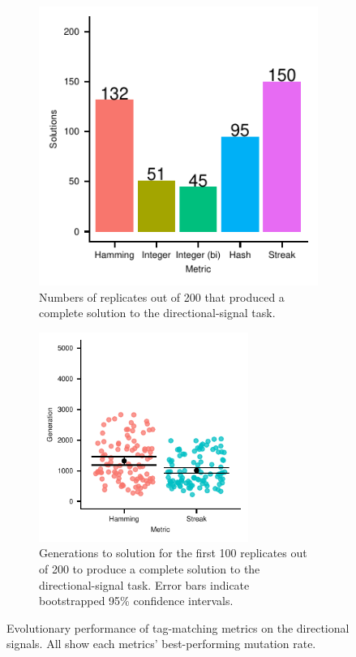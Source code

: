 \begin{figure}

\begin{subfigure}[b]{\linewidth}
\centering
\includegraphics[width=0.75\linewidth]{img/gp_results/panel-dst-sols.pdf}%
\caption{
Numbers of replicates out of 200 that produced a complete solution to the directional-signal task.}
\label{fig:dst-sols}
\end{subfigure}
\begin{subfigure}[b]{\linewidth}
\centering
\includegraphics[width=0.75\textwidth]{img/gp_results/panel-dst-times.pdf}%
\caption{
Generations to solution for the first 100 replicates out of 200 to produce a complete solution to the directional-signal task.
Error bars indicate bootstrapped 95\% confidence intervals.
}
\label{fig:dst-times}
\end{subfigure}

\label{fig:gp_results}

\caption{
Evolutionary performance of tag-matching metrics on the directional signals.
All show each metrics' best-performing mutation rate.
}

\label{fig:evo_directional_signal}
\end{figure}